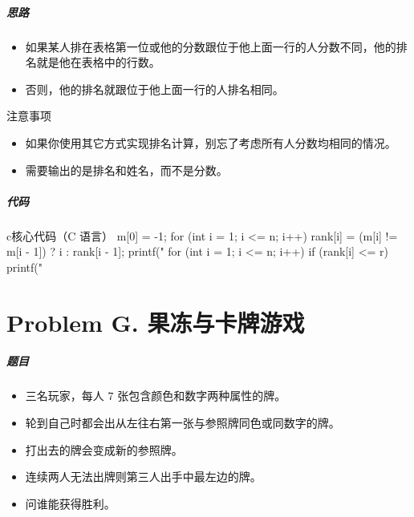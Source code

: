 \documentclass[
     aspectratio=169,                   %
]{beamer}
\begin{document}
\begin{frame}
	\frametitle{思路}
	\begin{itemize}
		\item 如果某人排在表格第一位或他的分数跟位于他上面一行的人分数不同，他的排名就是他在表格中的行数。
		\item 否则，他的排名就跟位于他上面一行的人排名相同。
	\end{itemize}
	\begin{alertblock}{注意事项}
		\begin{itemize}
			\item 如果你使用其它方式实现排名计算，别忘了考虑所有人分数均相同的情况。
			\item 需要输出的是排名和姓名，而不是分数。
		\end{itemize}
	\end{alertblock}
\end{frame}

\begin{frame}[fragile]
	\frametitle{代码}
	\begin{codeblock}{c}{核心代码（C 语言）}
m[0] = -1;
for (int i = 1; i <= n; i++) {
    rank[i] = (m[i] != m[i - 1]) ? i : rank[i - 1];
}
printf("%
for (int i = 1; i <= n; i++) {
    if (rank[i] <= r) {
        printf("%
    }
}
\end{codeblock}
\end{frame}


\part{Problem G. 果冻与卡牌游戏}
\begin{frame}
	\frametitle{题目}
	\begin{itemize}
		\item 三名玩家，每人 $7$ 张包含颜色和数字两种属性的牌。
		\item 轮到自己时都会出从左往右第一张与参照牌同色或同数字的牌。
		\item 打出去的牌会变成新的参照牌。
		\item 连续两人无法出牌则第三人出手中最左边的牌。
		\item 问谁能获得胜利。
	\end{itemize}
\end{frame}
\end{document}
